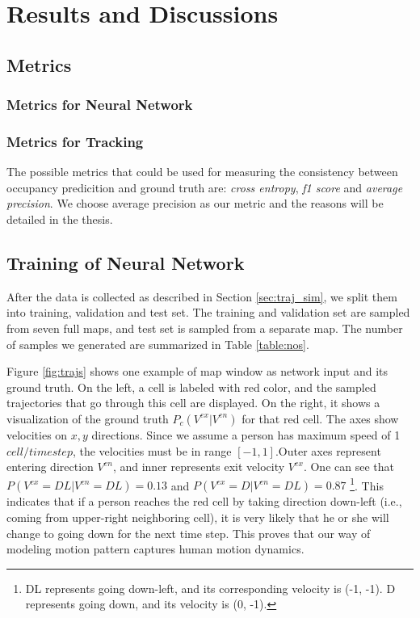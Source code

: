 \chapter{Results and Discussions} \label{chapter:5}


\section{Metrics} \label{sec:metrics}

\subsection{Metrics for Neural Network}

\subsection{Metrics for Tracking}

The possible metrics that could be used for measuring the consistency between occupancy predicition and ground truth are: \textit{cross entropy}, \textit{f1 score} and \textit{average precision}.  We choose average precision as our metric and the reasons will be detailed in the thesis.

\section{Training of Neural Network}

After the data is collected as described in Section \ref{sec:traj_sim}, we split them into training, validation and test set. The training and validation set are sampled from seven full maps, and test set is sampled from a separate map. The number of samples we generated are summarized in Table \ref{table:nos}. 

Figure \ref{fig:trajs} shows one example of map window as network input and its ground truth. On the left, a cell is labeled with red color, and the sampled trajectories that go through this cell are displayed. On the right, it shows a visualization of the ground truth \( P_c(V^{ex} | V^{en}) \) for that red cell. The axes show velocities on \( x, y\) directions. Since we assume a person has maximum speed of 1 $cell/timestep$, the velocities must be in range $[-1,1]. $Outer axes represent entering direction \( V^{en} \), and inner represents exit velocity \( V^{ex} \). One can see that \( P(V^{ex}=DL | V^{en}=DL) = 0.13 \) and \( P(V^{ex}=D | V^{en}=DL) = 0.87 \) \footnote{DL represents going down-left, and its corresponding velocity is (-1, -1). D represents going down, and its velocity is (0, -1).}. This indicates that if a person reaches the red cell by taking direction down-left (i.e., coming from upper-right neighboring cell), it is very likely that he or she will change to going down for the next time step. This proves that our way of modeling motion pattern captures human motion dynamics.

